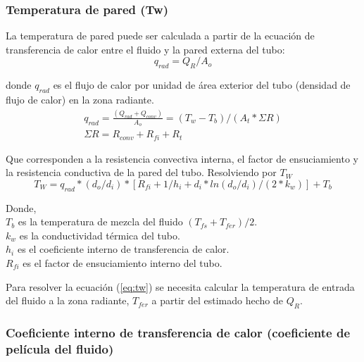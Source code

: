 \subsubsection{Temperatura de pared (Tw)}
\par La temperatura de pared puede ser calculada a partir de la ecuación de transferencia de calor entre el fluido y la pared externa del tubo:
\begin{equation*}
    q_{rad} = Q_R / A_o
\end{equation*}

donde $q_{rad}$ es el flujo de calor por unidad de área exterior del tubo (densidad de flujo de calor) en la zona radiante.
\begin{gather*}
q_{rad} = \frac{(Q_{rad} + Q_{conv})}{A_o} = (T_w - T_b) / (A_t *\Sigma R) \\
\Sigma R = R_{conv} + R_{fi} + R_t
\end{gather*}

\par Que corresponden a la resistencia convectiva interna, el factor de ensuciamiento y la resistencia conductiva de la pared del tubo. Resolviendo por $T_W$
\begin{equation}
\label{eq:tw}
T_W = q_{rad} *(d_o/d_i) *[ R_{fi} + 1/h_i + d_i*ln(d_o/d_i)/(2*k_w) ] +T_b
\end{equation}

\par Donde,\\
$T_b$ es la temperatura de mezcla del fluido $(T_{fs} + T_{fer})/2$. \\
$k_w$ es la conductividad térmica del tubo. \\
$h_i$ es el coeficiente interno de transferencia de calor. \\
$R_{fi}$ es el factor de ensuciamiento interno del tubo. \\

\par Para resolver la ecuación (\ref{eq:tw}) se necesita calcular la temperatura de entrada del fluido a la zona radiante, $T_{fer}$ a partir del estimado hecho de $Q_R$. 

\subsubsection{Coeficiente interno de transferencia de calor (coeficiente de película del fluido)}

